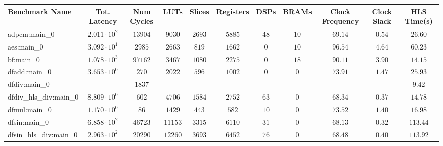 \begin{tabular}{|l|c|c|c|c|c|c|c|c|c|c|}
\hline
Benchmark Name          & Tot. Latency           & Num Cycles & LUTs      & Slices    & Registers & DSPs    & BRAMs   & Clock Frequency & Clock Slack & HLS Time(s) \\
\hline
adpcm:main\_0           & $ 2.011 \cdot 10^{2} $ & $ 13904  $ & $ 9030  $ & $ 2693  $ & $ 5885  $ & $ 48  $ & $ 10  $ & $ 69.14       $ & $ 0.54    $ & $ 26.60   $ \\
aes:main\_0             & $ 3.092 \cdot 10^{1} $ & $ 2985   $ & $ 2663  $ & $ 819   $ & $ 1662  $ & $ 0   $ & $ 10  $ & $ 96.54       $ & $ 4.64    $ & $ 60.23   $ \\
bf:main\_0              & $ 1.078 \cdot 10^{3} $ & $ 97162  $ & $ 3467  $ & $ 1080  $ & $ 2275  $ & $ 0   $ & $ 18  $ & $ 90.11       $ & $ 3.90    $ & $ 14.15   $ \\
dfadd:main\_0           & $ 3.653 \cdot 10^{0} $ & $ 270    $ & $ 2022  $ & $ 596   $ & $ 1002  $ & $ 0   $ & $ 0   $ & $ 73.91       $ & $ 1.47    $ & $ 25.93   $ \\
dfdiv:main\_0           & $                    $ & $ 1837   $ & $       $ & $       $ & $       $ & $     $ & $     $ & $             $ & $         $ & $ 9.42    $ \\
dfdiv\_hls\_div:main\_0 & $ 8.809 \cdot 10^{0} $ & $ 602    $ & $ 4706  $ & $ 1584  $ & $ 2752  $ & $ 63  $ & $ 0   $ & $ 68.34       $ & $ 0.37    $ & $ 14.78   $ \\
dfmul:main\_0           & $ 1.170 \cdot 10^{0} $ & $ 86     $ & $ 1429  $ & $ 443   $ & $ 582   $ & $ 10  $ & $ 0   $ & $ 73.52       $ & $ 1.40    $ & $ 16.98   $ \\
dfsin:main\_0           & $ 6.858 \cdot 10^{2} $ & $ 46723  $ & $ 11153 $ & $ 3315  $ & $ 6110  $ & $ 31  $ & $ 0   $ & $ 68.13       $ & $ 0.32    $ & $ 113.44  $ \\
dfsin\_hls\_div:main\_0 & $ 2.963 \cdot 10^{2} $ & $ 20290  $ & $ 12260 $ & $ 3693  $ & $ 6452  $ & $ 76  $ & $ 0   $ & $ 68.48       $ & $ 0.40    $ & $ 113.92  $ \\

\end{tabular}
